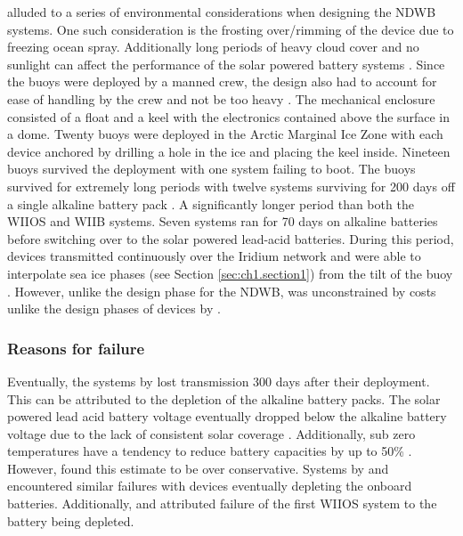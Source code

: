\par \textcite{doble2017robust} alluded to a series of environmental considerations when designing the NDWB systems. One such consideration is the frosting over/rimming of the device due to freezing ocean spray. Additionally long periods of heavy cloud cover and no sunlight can affect the performance of the solar powered battery systems \cite{doble2017robust,lever2006solar}. Since the buoys were deployed by a manned crew, the design also had to account for ease of handling by the crew and not be too heavy \cite{doble2017robust}. The mechanical enclosure consisted of a float and a keel with the electronics contained above the surface in a dome. Twenty buoys were deployed in the Arctic Marginal Ice Zone with each device anchored by drilling a hole in the ice and placing the keel inside. Nineteen buoys survived the deployment with one system failing to boot. The buoys survived for extremely long periods with twelve systems surviving for 200 days off a single alkaline battery pack \cite{doble2017robust}. A significantly longer period than both the WIIOS and WIIB systems. Seven systems ran for 70 days on alkaline batteries before switching over to  the solar powered lead-acid batteries. During this period, devices transmitted continuously over the Iridium network and were able to interpolate sea ice phases (see Section \ref{sec:ch1.section1}) from the tilt of the buoy \cite{doble2017robust}. However, unlike the design phase for the NDWB, was unconstrained by costs unlike the design phases of devices by \textcite{rabault2019open,PLANCK2019102792,kohout2015device}. 

\subsubsection{Reasons for failure}
\label{ch2:sec3_failiure}

Eventually, the systems by \textcite{doble2017robust} lost transmission 300 days after their deployment. This can be attributed to the depletion of the alkaline battery packs. The solar powered lead acid battery voltage eventually dropped below the alkaline battery voltage due to the lack of consistent solar coverage \cite{doble2017robust}. Additionally, sub zero temperatures have a tendency to reduce battery capacities by up to 50\% \cite{doble2017robust}. However, \textcite{doble2017robust} found this estimate to be over conservative. Systems by \textcite{kohout2015device} and \textcite{doble2017robust} encountered similar failures with devices eventually depleting the onboard batteries. Additionally, \textcite{vichi2019effects} and \textcite{alberello2019drift} attributed failure of the first WIIOS system to the battery being depleted.\par 

